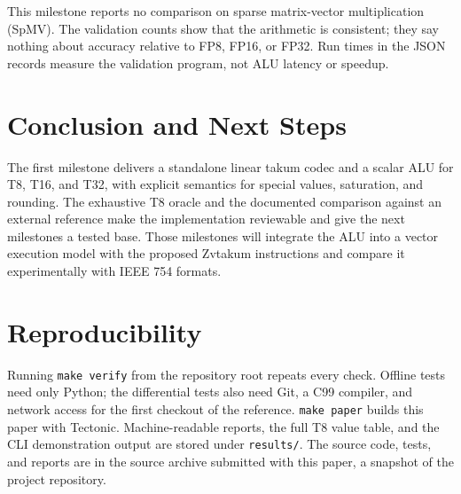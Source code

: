 \documentclass[conference]{IEEEtran}
\newcommand{\code}[1]{\texttt{#1}}
\begin{document}
This milestone reports no comparison on sparse matrix-vector multiplication
(SpMV). The validation counts show that the arithmetic is consistent; they say
nothing about accuracy relative to FP8, FP16, or FP32. Run times in the JSON
records measure the validation program, not ALU latency or speedup.

\section{Conclusion and Next Steps}
The first milestone delivers a standalone linear takum codec and a scalar ALU
for T8, T16, and T32, with explicit semantics for special values, saturation,
and rounding. The exhaustive T8 oracle and the documented comparison against an
external reference make the implementation reviewable and give the next
milestones a tested base. Those milestones will integrate the ALU into a vector
execution model with the proposed Zvtakum instructions and compare it
experimentally with IEEE 754 formats.

\section*{Reproducibility}
Running \code{make verify} from the repository root repeats every check. Offline
tests need only Python; the differential tests also need Git, a C99 compiler,
and network access for the first checkout of the reference. \code{make paper}
builds this paper with Tectonic. Machine-readable reports, the full T8 value
table, and the CLI demonstration output are stored under \code{results/}.
The source code, tests, and reports are in the source archive submitted with
this paper, a snapshot of the project repository.
\end{document}
